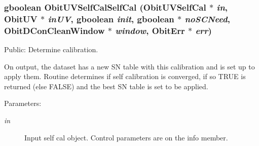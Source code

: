\subsubsection{\setlength{\rightskip}{0pt plus 5cm}gboolean Obit\-UVSelf\-Cal\-Self\-Cal ({\bf Obit\-UVSelf\-Cal} $\ast$ {\em in}, {\bf Obit\-UV} $\ast$ {\em in\-UV}, gboolean {\em init}, gboolean $\ast$ {\em no\-SCNeed}, {\bf Obit\-DCon\-Clean\-Window} $\ast$ {\em window}, {\bf Obit\-Err} $\ast$ {\em err})}\label{ObitUVSelfCal_8h_a10}


Public: Determine calibration. 

On output, the dataset has a new SN table with this calibration and is set up to apply them. Routine determines if self calibration is converged, if so TRUE is returned (else FALSE) and the best SN table is set to be applied. \begin{Desc}
\item[Parameters:]
\begin{description}
\item[{\em in}]Input self cal object. Control parameters are on the info member. \begin{itemize}

\end{itemize}
\end{description}
\end{Desc}
